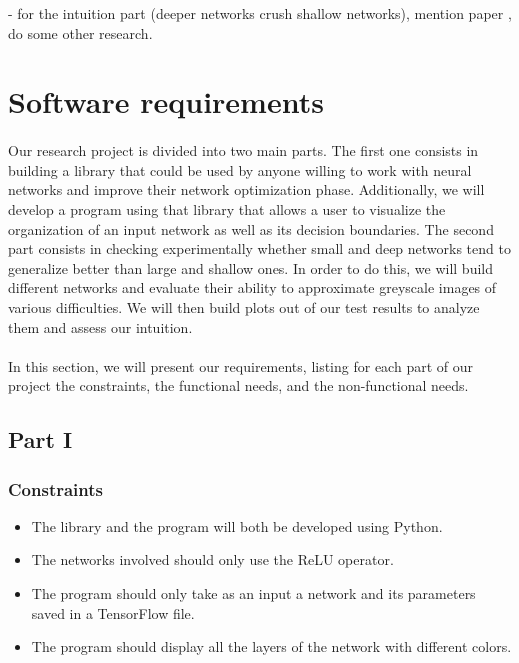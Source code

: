 \documentclass[a4paper]{article}
\begin{document}
- for the intuition part (deeper networks crush shallow networks), mention paper \citep{Mhaskar17}, do some other research.


\section{Software requirements}
\paragraph{}Our research project is divided into two main parts. The first one consists in building a library that could be used by anyone willing to work with neural networks and improve their network optimization phase. Additionally, we will develop a program using that library that allows a user to visualize the organization of an input network as well as its decision boundaries. The second part consists in checking experimentally whether small and deep networks tend to generalize better than large and shallow ones. In order to do this, we will build different networks and evaluate their ability to approximate greyscale images of various difficulties. We will then build plots out of our test results to analyze them and assess our intuition.

\paragraph{}In this section, we will present our requirements, listing for each part of our project the constraints, the functional needs, and the non-functional needs. 

\subsection{Part I}
\subsubsection{Constraints}
\begin{itemize}
\item The library and the program will both be developed using Python.
\item The networks involved should only use the ReLU operator. 
\item The program should only take as an input a network and its parameters saved in a TensorFlow file.
\item The program should display all the layers of the network with different colors.
\end{itemize}
\end{document}
